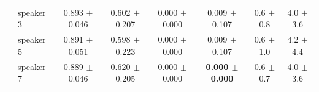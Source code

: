 \begin{table}
\begin{tabular}{ll!{\vrule width 1.2pt}cc!{\vrule width 1.2pt}cc!{\vrule width 1.2pt}cc}
 & speaker 3 & 0.893 {\scriptsize $\pm$0.046} & 0.602 {\scriptsize $\pm$0.207} & 0.000 {\scriptsize $\pm$0.000} & 0.009 {\scriptsize $\pm$0.107} & 0.6 {\scriptsize $\pm$0.8} & 4.0 {\scriptsize $\pm$3.6} \\
 & speaker 5 & 0.891 {\scriptsize $\pm$0.051} & 0.598 {\scriptsize $\pm$0.223} & 0.000 {\scriptsize $\pm$0.000} & 0.009 {\scriptsize $\pm$0.107} & 0.6 {\scriptsize $\pm$1.0} & 4.2 {\scriptsize $\pm$4.4} \\
 & speaker 7 & 0.889 {\scriptsize $\pm$0.046} & 0.620 {\scriptsize $\pm$0.205} & 0.000 {\scriptsize $\pm$0.000} & \bfseries 0.000 {\scriptsize $\pm$0.000} & 0.6 {\scriptsize $\pm$0.7} & 4.0 {\scriptsize $\pm$3.6} \\
\bottomrule
\end{tabular}
\end{table}
